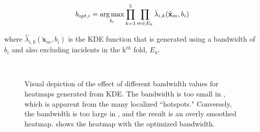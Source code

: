 \documentclass{svjour3}
\begin{document}
\begin{equation}
  \label{eqn:fivefold}
   b_{opt,i} = \operatorname*{arg\,max}_{b_i} \prod_{k=1}^5 \prod_{m \in E_k}   \hat\lambda_{i,k}(\tilde{\textbf{x}}_m,b_i)
\end{equation}

\noindent where $\hat\lambda_{i,k}(\tilde{\textbf{x}}_m,b_i)$ is the KDE function that is generated using a bandwidth of $b_i$ and also excluding incidents in the k$^{th}$ fold, $E_k$. 

\begin{figure}[!ht]
       \begin{center}
          \\ %
      \end{center}
      \caption{ Visual depiction of the effect of different bandwidth values for heatmaps generated from KDE. The bandwidth is too small in \protect{}, which is apparent from the many localized ``hotspots."  Conversely, the bandwidth is too large in \protect{}, and the result is an overly smoothed heatmap. \protect{} shows the heatmap with the optimized bandwidth.}
     \label{fig:band_comparison}
  \end{figure}
  
\end{document}
